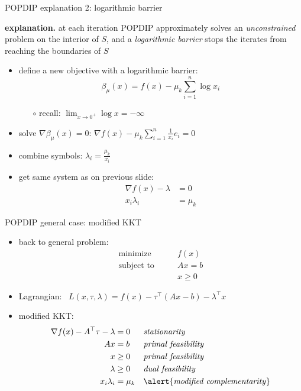 \documentclass[10pt,hyperref,dvipsnames]{beamer}
\newcommand{\grad}{\nabla}
\newcommand{\ds}{\displaystyle}
\begin{document}
\begin{frame}{POPDIP explanation 2: logarithmic barrier}

\textbf{explanation.}  at each iteration POPDIP approximately solves an \emph{unconstrained} problem on the interior of $S$, and a \emph{logarithmic barrier} stops the iterates from reaching the boundaries of $S$

\bigskip
\begin{itemize}
\item define a new objective with a logarithmic barrier:
\begin{equation*}
\beta_\mu(x) = f(x) - \mu_k \sum_{i=1}^n \log x_i
\end{equation*}

\vspace{-1mm}
    \begin{itemize}
    \item[$\circ$] recall: \quad $\ds \lim_{x\to 0^+} \log x = -\infty$
    \end{itemize}
\item solve $\grad \beta_\mu(x)=0$: \quad $\ds \grad f(x) - \mu_k \sum_{i=1}^n \frac{1}{x_i} e_i = 0$
\item combine symbols: $\ds \lambda_i = \frac{\mu_k}{x_i}$
\item get same system as on previous slide:
\begin{align*}
\grad f(x) - \lambda &= 0 \\
       x_i \lambda_i &= \mu_k
\end{align*}
\end{itemize}
\end{frame}


\begin{frame}{POPDIP general case: modified KKT}

\begin{itemize}
\item back to general problem:
\begin{equation*}
\begin{matrix}
\text{minimize} \qquad & f(x) \\
\text{subject to} \qquad & A x = b \\
 & x \ge 0
\end{matrix}
\end{equation*}
\item Lagrangian: \, $L(x,\tau,\lambda) = f(x) - \tau^\top (Ax-b) - \lambda^\top x$
\item modified KKT:
\begin{align*}
\grad f(x) - A^\top \tau - \lambda &= 0   &&\text{\emph{stationarity}} \\
                A x &= b &&\text{\emph{primal feasibility}} \\
                   x &\ge 0 &&\text{\emph{primal feasibility}} \\
             \lambda &\ge 0 &&\text{\emph{dual feasibility}} \\
       x_i \lambda_i &= \mu_k && \text{\alert{\emph{modified complementarity}}}
\end{align*}
\end{itemize}
\end{frame}
\end{document}
